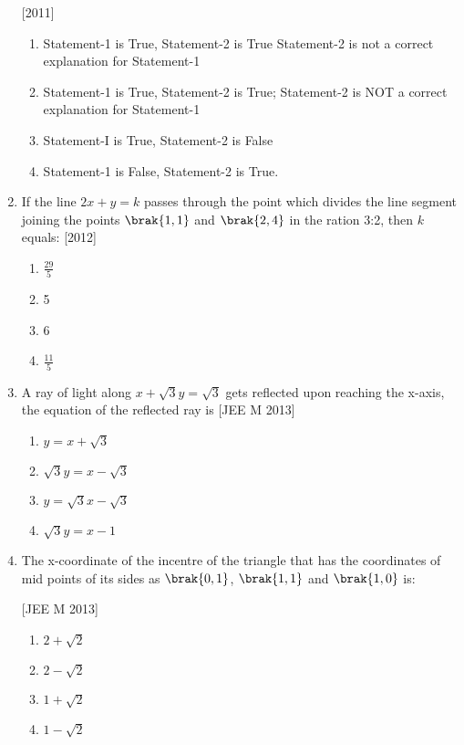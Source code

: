 \begin{enumerate}
\hfill{[2011]}
   \begin{enumerate}
   \item Statement-1 is True, Statement-2 is True Statement-2 
is not a correct explanation for Statement-1 
   \item Statement-1 is True, Statement-2 is True; Statement-2 
is NOT a correct explanation for Statement-1 
   \item Statement-I is True, Statement-2 is False
   \item Statement-1 is False, Statement-2 is True. 
   \end{enumerate}

\item If the line $2x+y=k$ passes through the point which divides the line segment joining the points $\brak{1, 1}$ and $\brak{2, 4}$ in the ration 3:2, then $k$ equals: \hfill{[2012]}
\begin{multicols}{4}
\begin{enumerate}
\item $\frac{29}{5}$
\item 5
\item 6
\item $\frac{11}{5}$
\end{enumerate}
\end{multicols} 

\item A ray of light along $x+\sqrt{3}y=\sqrt{3}$ gets reflected upon reaching the x-axis, the equation of the reflected ray is \hfill{[JEE M 2013]}
\begin{multicols}{2}
\begin{enumerate}
\item $y=x+\sqrt{3}$
\item $\sqrt{3}y=x-\sqrt{3}$
\item $y=\sqrt{3}x-\sqrt{3}$
\item $\sqrt{3}y=x-1$
\end{enumerate}
\end{multicols}

\item The x-coordinate of the incentre of the triangle that has the coordinates of mid points of its sides as $\brak{0, 1}$, $\brak{1, 1}$ and $\brak{1, 0}$ is:

\hfill{[JEE M 2013]}
\begin{multicols}{4}
\begin{enumerate}
\item $2+\sqrt{2}$
\item $2-\sqrt{2}$
\item $1+\sqrt{2}$
\item $1-\sqrt{2}$
\end{enumerate}
\end{multicols}


\end{enumerate}
